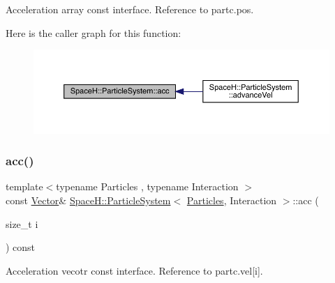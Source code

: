 Acceleration array const interface. Reference to partc.\+pos. 

Here is the caller graph for this function\+:
\nopagebreak
\begin{figure}[H]
\begin{center}
\leavevmode
\includegraphics[width=350pt]{class_space_h_1_1_particle_system_a9c7f70968a15d3d02248b313b086b21d_icgraph}
\end{center}
\end{figure}
\mbox{\label{class_space_h_1_1_particle_system_a8cf5717cbb5b08d762fdfd6c6fd37d76}} 
\subsubsection{\texorpdfstring{acc()}{acc()}\hspace{0.1cm}{\footnotesize\ttfamily [2/2]}}
{\footnotesize\ttfamily template$<$typename Particles , typename Interaction $>$ \\
const \mbox{\hyperlink{class_space_h_1_1_particle_system_a7cb2705f7e4edf94131c31eda3edfded}{Vector}}\& \mbox{\hyperlink{class_space_h_1_1_particle_system}{Space\+H\+::\+Particle\+System}}$<$ \mbox{\hyperlink{struct_space_h_1_1_particles}{Particles}}, Interaction $>$\+::acc (\begin{DoxyParamCaption}\item[{size\+\_\+t}]{i }\end{DoxyParamCaption}) const\hspace{0.3cm}{\ttfamily [inline]}}



Acceleration vecotr const interface. Reference to partc.\+vel\mbox{[}i\mbox{]}. 

\mbox{\label{class_space_h_1_1_particle_system_acdd6ab19e8a43161d4e508efd4f01d5c}} 

